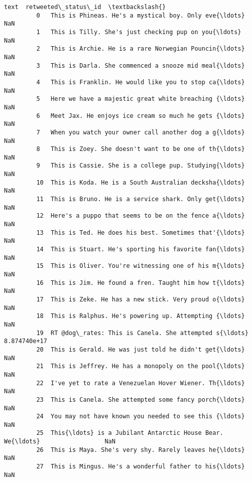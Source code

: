 \documentclass[11pt]{article}
\begin{document}
\begin{Verbatim}[commandchars=\\\{\}]
                                                          text  retweeted\_status\_id  \textbackslash{}
         0   This is Phineas. He's a mystical boy. Only eve{\ldots}                  NaN   
         1   This is Tilly. She's just checking pup on you{\ldots}                  NaN   
         2   This is Archie. He is a rare Norwegian Pouncin{\ldots}                  NaN   
         3   This is Darla. She commenced a snooze mid meal{\ldots}                  NaN   
         4   This is Franklin. He would like you to stop ca{\ldots}                  NaN   
         5   Here we have a majestic great white breaching {\ldots}                  NaN   
         6   Meet Jax. He enjoys ice cream so much he gets {\ldots}                  NaN   
         7   When you watch your owner call another dog a g{\ldots}                  NaN   
         8   This is Zoey. She doesn't want to be one of th{\ldots}                  NaN   
         9   This is Cassie. She is a college pup. Studying{\ldots}                  NaN   
         10  This is Koda. He is a South Australian decksha{\ldots}                  NaN   
         11  This is Bruno. He is a service shark. Only get{\ldots}                  NaN   
         12  Here's a puppo that seems to be on the fence a{\ldots}                  NaN   
         13  This is Ted. He does his best. Sometimes that'{\ldots}                  NaN   
         14  This is Stuart. He's sporting his favorite fan{\ldots}                  NaN   
         15  This is Oliver. You're witnessing one of his m{\ldots}                  NaN   
         16  This is Jim. He found a fren. Taught him how t{\ldots}                  NaN   
         17  This is Zeke. He has a new stick. Very proud o{\ldots}                  NaN   
         18  This is Ralphus. He's powering up. Attempting {\ldots}                  NaN   
         19  RT @dog\_rates: This is Canela. She attempted s{\ldots}         8.874740e+17   
         20  This is Gerald. He was just told he didn't get{\ldots}                  NaN   
         21  This is Jeffrey. He has a monopoly on the pool{\ldots}                  NaN   
         22  I've yet to rate a Venezuelan Hover Wiener. Th{\ldots}                  NaN   
         23  This is Canela. She attempted some fancy porch{\ldots}                  NaN   
         24  You may not have known you needed to see this {\ldots}                  NaN   
         25  This{\ldots} is a Jubilant Antarctic House Bear. We{\ldots}                  NaN   
         26  This is Maya. She's very shy. Rarely leaves he{\ldots}                  NaN   
         27  This is Mingus. He's a wonderful father to his{\ldots}                  NaN   

\end{Verbatim}
\end{document}
